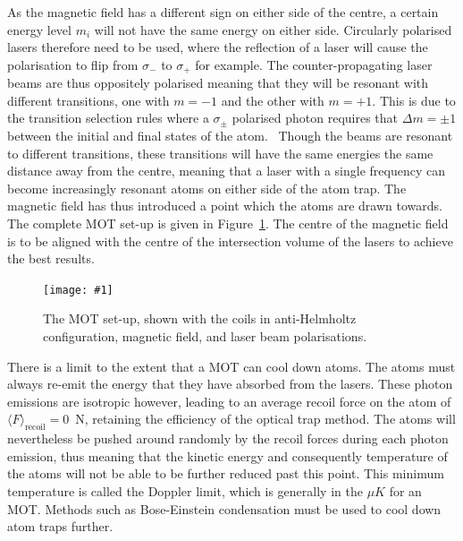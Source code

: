 \documentclass[twocolumn]{article}
\newcommand{\insertFigure}[1]{%
   \texttt{[image: \#1]}%
}
\begin{document}
As the magnetic field has a different sign on either side of the centre, a certain energy level $m_i$ will not have the same energy on either side. Circularly polarised lasers therefore need to be used, where the reflection of a laser will cause the polarisation to flip from $\sigma_-$ to $\sigma_+$ for example. The counter-propagating laser beams are thus oppositely polarised meaning that they will be resonant with different transitions, one with $m=-1$ and the other with $m=+1$. This is due to the transition selection rules where a $\sigma_\pm$ polarised photon requires that $\Delta m=\pm1$ between the initial and final states of the atom.~\cite{Foot} Though the beams are resonant to different transitions, these transitions will have the same energies the same distance away from the centre, meaning that a laser with a single frequency can become increasingly resonant atoms on either side of the atom trap. The magnetic field has thus introduced a point which the atoms are drawn towards. The complete MOT set-up is given in Figure~\ref{fig:MOT2}. The centre of the magnetic field is to be aligned with the centre of the intersection volume of the lasers to achieve the best results. \\
\begin{figure} [!h]
	\centering
	\insertFigure{Images/MOT2.png}
	\caption{The MOT set-up, shown with the coils in anti-Helmholtz configuration, magnetic field, and laser beam polarisations.~\cite{Foot}}
	\label{fig:MOT2}
\end{figure}
 
\par There is a limit to the extent that a MOT can cool down atoms. The atoms must always re-emit the energy that they have absorbed from the lasers. These photon emissions are isotropic however, leading to an average recoil force on the atom of $\langle F\rangle_{\text{recoil}}=0$~N, retaining the efficiency of the optical trap method. The atoms will nevertheless be pushed around randomly by the recoil forces during each photon emission, thus meaning that the kinetic energy and consequently temperature of the atoms will not be able to be further reduced past this point. This minimum temperature is called the Doppler limit, which is generally in the $\mu K$ for an MOT. Methods such as Bose-Einstein condensation must be used to cool down atom traps further. 
\end{document}
